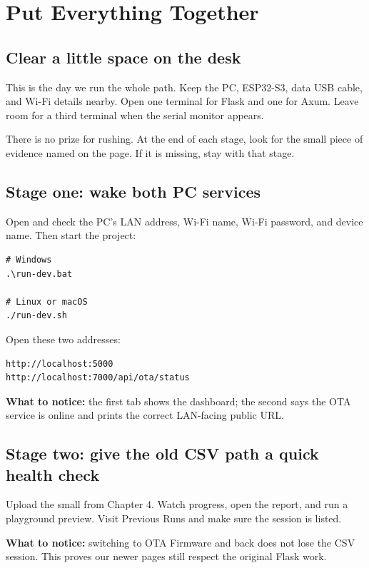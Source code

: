 \chapter{Put Everything Together}

\section{Clear a little space on the desk}

This is the day we run the whole path. Keep the PC, ESP32-S3, data USB cable, and Wi-Fi details nearby. Open one terminal for Flask and one for Axum. Leave room for a third terminal when the serial monitor appears.

There is no prize for rushing. At the end of each stage, look for the small piece of evidence named on the page. If it is missing, stay with that stage.

\section{Stage one: wake both PC services}

Open  and check the PC's LAN address, Wi-Fi name, Wi-Fi password, and device name. Then start the project:

\begin{lstlisting}[numbers=none]
# Windows
.\run-dev.bat

# Linux or macOS
./run-dev.sh
\end{lstlisting}

Open these two addresses:

\begin{lstlisting}[numbers=none]
http://localhost:5000
http://localhost:7000/api/ota/status
\end{lstlisting}

\textbf{What to notice:} the first tab shows the dashboard; the second says the OTA service is online and prints the correct LAN-facing public URL.

\section{Stage two: give the old CSV path a quick health check}

Upload the small  from Chapter 4. Watch progress, open the report, and run a playground preview. Visit Previous Runs and make sure the session is listed.

\textbf{What to notice:} switching to OTA Firmware and back does not lose the CSV session. This proves our newer pages still respect the original Flask work.

